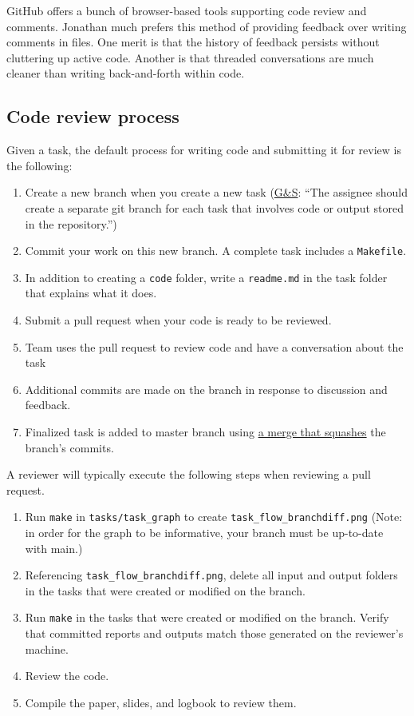 GitHub offers a bunch of browser-based tools supporting code review and comments.
Jonathan much prefers this method of providing feedback over writing comments in files.
One merit is that the history of feedback persists without cluttering up active code.
Another is that threaded conversations are much cleaner than writing back-and-forth within code.

\subsection{Code review process}\label{code_review_process}
Given a task, the default process for writing code and submitting it for review is the following:
\begin{enumerate}
\item Create a new branch when you create a new task (\href{https://github.com/gslab-econ/ra-manual/wiki/Tasks}{G\&S}: ``The assignee should create a separate git branch for each task that involves code or output stored in the repository.'')
\item Commit your work on this new branch. A complete task includes a \texttt{Makefile}.
\item In addition to creating a \texttt{code} folder, write a \texttt{readme.md} in the task folder that explains what it does.
\item Submit a pull request when your code is ready to be reviewed.
\item Team uses the pull request to review code and have a conversation about the task
\item Additional commits are made on the branch in response to discussion and feedback.
\item Finalized task is added to master branch using \href{https://docs.github.com/en/pull-requests/collaborating-with-pull-requests/incorporating-changes-from-a-pull-request/about-pull-request-merges#squash-and-merge-your-commits}{a merge that squashes} the branch's commits.
\end{enumerate}

A reviewer will typically execute the following steps when reviewing a pull request.

\begin{enumerate}
\item Run \texttt{make} in \texttt{tasks/task\_graph} to create \texttt{task\_flow\_branchdiff.png}
    (Note: in order for the graph to be informative, your branch must be up-to-date with main.)
\item Referencing \texttt{task\_flow\_branchdiff.png},
    delete all input and output folders in the tasks that were created or
    modified on the branch.
\item Run \texttt{make} in the tasks that were created or modified on the branch.
Verify that committed reports and outputs match those generated on the reviewer's machine.
\item Review the code.
\item Compile the paper, slides, and logbook to review them.
\end{enumerate}

